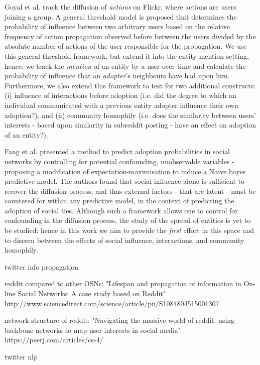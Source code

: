 \documentclass[journal,10pt,draftclsnofoot,onecolumn]{IEEEtran}
\begin{document}
Goyal et al. \cite{goyal2010learning} track the diffusion of \emph{actions} on Flickr, where actions are users joining a group.
A general threshold model is proposed that determines the probability of influence between two arbitrary users based on the relative frequency of action propagation observed before between the users divided by the absolute number of actions of the user responsible for the propagation.
We use this general threshold framework, but extend it into the entity-mention setting, hence: we track the \emph{mention} of an entity by a user over time and calculate the probability of influence that an \emph{adopter}'s neighbours have had upon him.
Furthermore, we also extend this framework to test for two additional constructs: (i) influence of interactions before adoption (i.e. did the degree to which an individual communicated with a previous entity adopter influence their own adoption?), and (ii) community homophily (i.e. does the similarity between users' interests - based upon similarity in subreddit posting - have an effect on adoption of an entity?).

Fang et al. \cite{fang2013predicting} presented a method to predict adoption probabilities in social networks by controlling for potential confounding, unobservable variables - proposing a modification of expectation-maximisation to induce a Naive bayes predictive model.
The authors found that social influence alone is sufficient to recover the diffusion process, and thus external factors - that are latent - must be countered for within any predictive model, in the context of predicting the adoption of social ties.
Although such a framework allows one to control for confounding in the diffusion process, the study of the spread of entities is yet to be studied: hence in this work we aim to provide the \emph{first} effort in this space and to discern between the effects of social influence, interactions, and community homophily.




twitter info propagation

reddit compared to other OSNs: "Lifespan and propagation of information in On-line Social Networks: A case study based on Reddit"  http://www.sciencedirect.com/science/article/pii/S1084804515001307

network structure of reddit: "Navigating the massive world of reddit: using backbone networks to map user interests in social media" https://peerj.com/articles/cs-4/

twitter nlp
\end{document}
